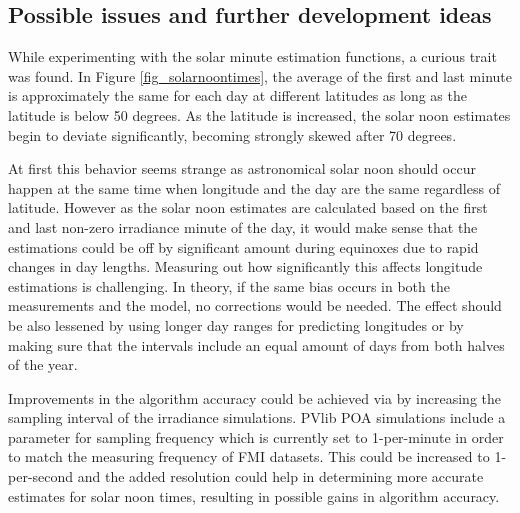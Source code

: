 



\newpage
\subsection{Possible issues and further development ideas}
While experimenting with the solar minute estimation functions, a curious trait was found. In Figure \ref{fig_solarnoontimes}, the average of the first and last minute is approximately the same for each day at different latitudes as long as the latitude is below 50 degrees. As the latitude is increased, the solar noon estimates begin to deviate significantly, becoming strongly skewed after 70 degrees. 

At first this behavior seems strange as astronomical solar noon should occur happen at the same time when longitude and the day are the same regardless of latitude. However as the solar noon estimates are calculated based on the first and last non-zero irradiance minute of the day, it would make sense that the estimations could be off by significant amount during equinoxes due to rapid changes in day lengths. Measuring out how significantly this affects longitude estimations is challenging. In theory, if the same bias occurs in both the measurements and the model, no corrections would be needed. The effect should be also lessened by using longer day ranges for predicting longitudes or by making sure that the intervals include an equal amount of days from both halves of the year. 

Improvements in the algorithm accuracy could be achieved via by increasing the sampling interval of the irradiance simulations. PVlib POA simulations include a parameter for sampling frequency which is currently set to 1-per-minute in order to match the measuring frequency of FMI datasets. This could be increased to 1-per-second and the added resolution could help in determining more accurate estimates for solar noon times, resulting in possible gains in algorithm accuracy.

